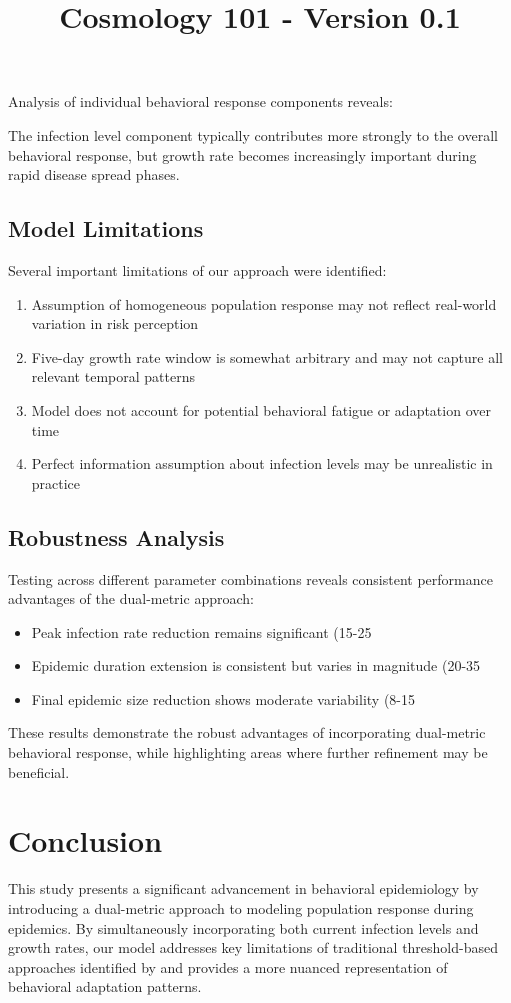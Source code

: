 \documentclass{article}\usepackage{graphicx} \usepackage{amsmath} \usepackage{colortbl}\title{Cosmology 101 - Version 0.1}
\begin{document}
Analysis of individual behavioral response components reveals:



The infection level component typically contributes more strongly to the overall behavioral response, but growth rate becomes increasingly important during rapid disease spread phases.

\subsection{Model Limitations}

Several important limitations of our approach were identified:

\begin{enumerate}
\item Assumption of homogeneous population response may not reflect real-world variation in risk perception
\item Five-day growth rate window is somewhat arbitrary and may not capture all relevant temporal patterns
\item Model does not account for potential behavioral fatigue or adaptation over time
\item Perfect information assumption about infection levels may be unrealistic in practice
\end{enumerate}

\subsection{Robustness Analysis}

Testing across different parameter combinations reveals consistent performance advantages of the dual-metric approach:

\begin{itemize}
\item Peak infection rate reduction remains significant (15-25%
\item Epidemic duration extension is consistent but varies in magnitude (20-35%
\item Final epidemic size reduction shows moderate variability (8-15%
\end{itemize}

These results demonstrate the robust advantages of incorporating dual-metric behavioral response, while highlighting areas where further refinement may be beneficial.\section{Conclusion}
This study presents a significant advancement in behavioral epidemiology by introducing a dual-metric approach to modeling population response during epidemics. By simultaneously incorporating both current infection levels and growth rates, our model addresses key limitations of traditional threshold-based approaches identified by \cite{funk2010modelling} and provides a more nuanced representation of behavioral adaptation patterns.
\end{document}
